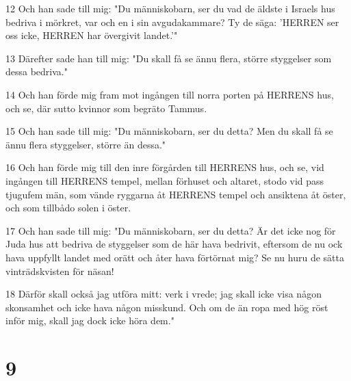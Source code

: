 \par 12 Och han sade till mig: "Du människobarn, ser du vad de äldste i Israels hus bedriva i mörkret, var och en i sin avgudakammare? Ty de säga: 'HERREN ser oss icke, HERREN har övergivit landet.'"
\par 13 Därefter sade han till mig: "Du skall få se ännu flera, större styggelser som dessa bedriva."
\par 14 Och han förde mig fram mot ingången till norra porten på HERRENS hus, och se, där sutto kvinnor som begräto Tammus.
\par 15 Och han sade till mig: "Du människobarn, ser du detta? Men du skall få se ännu flera styggelser, större än dessa."
\par 16 Och han förde mig till den inre förgården till HERRENS hus, och se, vid ingången till HERRENS tempel, mellan förhuset och altaret, stodo vid pass tjugufem män, som vände ryggarna åt HERRENS tempel och ansiktena åt öster, och som tillbådo solen i öster.
\par 17 Och han sade till mig: "Du människobarn, ser du detta? Är det icke nog för Juda hus att bedriva de styggelser som de här hava bedrivit, eftersom de nu ock hava uppfyllt landet med orätt och åter hava förtörnat mig? Se nu huru de sätta vinträdskvisten för näsan!
\par 18 Därför skall också jag utföra mitt: verk i vrede; jag skall icke visa någon skonsamhet och icke hava någon misskund. Och om de än ropa med hög röst inför mig, skall jag dock icke höra dem."

\chapter{9}

